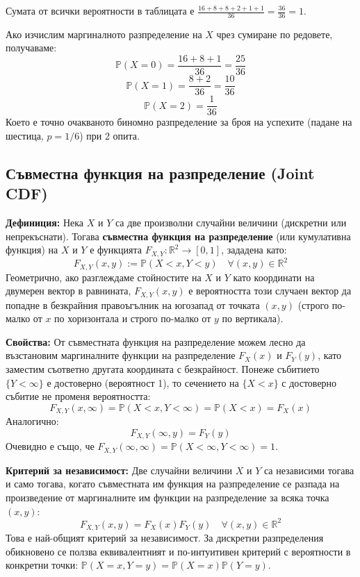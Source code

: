 \documentclass{article}
\begin{document}
Сумата от всички вероятности в таблицата е $\frac{16+8+8+2+1+1}{36} = \frac{36}{36} = 1$. 

Ако изчислим маргиналното разпределение на $X$ чрез сумиране по редовете, получаваме:
\[
\mathbb{P}(X=0) = \frac{16+8+1}{36} = \frac{25}{36}
\]
\[
\mathbb{P}(X=1) = \frac{8+2}{36} = \frac{10}{36}
\]
\[
\mathbb{P}(X=2) = \frac{1}{36}
\]
Което е точно очакваното биномно разпределение за броя на успехите (падане на шестица, $p = 1/6$) при 2 опита.


\subsection{Съвместна функция на разпределение (Joint CDF)}

\textbf{Дефиниция:} Нека $X$ и $Y$ са две произволни случайни величини (дискретни или непрекъснати). Тогава \textbf{съвместна функция на разпределение} (или кумулативна функция) на $X$ и $Y$ е функцията $F_{X,Y} : \mathbb{R}^2 \to [0, 1]$, зададена като:
\[
F_{X,Y}(x,y) := \mathbb{P}(X < x, Y < y) \quad \forall (x,y) \in \mathbb{R}^2
\]
Геометрично, ако разглеждаме стойностите на $X$ и $Y$ като координати на двумерен вектор в равнината, $F_{X,Y}(x,y)$ е вероятността този случаен вектор да попадне в безкрайния правоъгълник на югозапад от точката $(x, y)$ (строго по-малко от $x$ по хоризонтала и строго по-малко от $y$ по вертикала).

\textbf{Свойства:}
От съвместната функция на разпределение можем лесно да възстановим маргиналните функции на разпределение $F_X(x)$ и $F_Y(y)$, като заместим съответно другата координата с безкрайност. Понеже събитието $\{Y < \infty\}$ е достоверно (вероятност 1), то сечението на $\{X < x\}$ с достоверно събитие не променя вероятността:
\[
F_{X,Y}(x, \infty) = \mathbb{P}(X < x, Y < \infty) = \mathbb{P}(X < x) = F_X(x)
\]
Аналогично:
\[
F_{X,Y}(\infty, y) = F_Y(y)
\]
Очевидно е също, че $F_{X,Y}(\infty, \infty) = \mathbb{P}(X < \infty, Y < \infty) = 1$.

\textbf{Критерий за независимост:} 
Две случайни величини $X$ и $Y$ са независими тогава и само тогава, когато съвместната им функция на разпределение се разпада на произведение от маргиналните им функции на разпределение за всяка точка $(x,y)$:
\[
F_{X,Y}(x, y) = F_X(x) F_Y(y) \quad \forall (x,y) \in \mathbb{R}^2
\]
Това е най-общият критерий за независимост. За дискретни разпределения обикновено се ползва еквивалентният и по-интуитивен критерий с вероятности в конкретни точки: $\mathbb{P}(X = x, Y = y) = \mathbb{P}(X = x) \mathbb{P}(Y = y)$.
\end{document}
